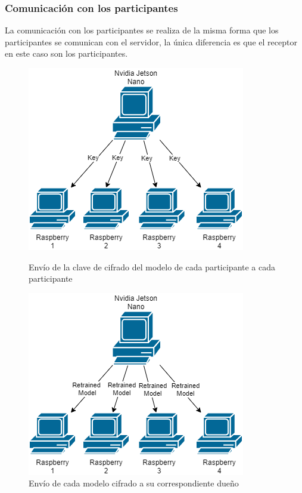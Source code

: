 \subsubsection{Comunicación con los participantes}
La comunicación con los participantes se realiza de la misma forma que los participantes se comunican con el servidor, la única diferencia es que el receptor en este caso son los participantes.
\begin{figure}[H]
    \begin{minipage}[t]{0.45\linewidth}  %
        \centering
        \includegraphics[width=\textwidth]{Figuras/Network_node_encrypted_key.png}
        \caption{Envío de la clave de cifrado del modelo de cada participante a cada participante} 
    \end{minipage}
    \hfill
    \begin{minipage}[t]{0.45\linewidth}  %
        \centering
        \includegraphics[width=\textwidth]{Figuras/Network_node_encrypted_model.png}    
        \caption{Envío de cada modelo cifrado a su correspondiente dueño} 
    \end{minipage}
\end{figure}
